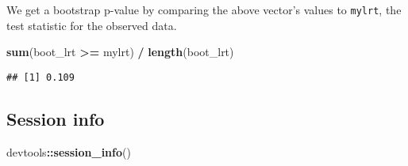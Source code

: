 \documentclass[oneside]{book}
\newenvironment{Shaded}{\begin{snugshade}}{\end{snugshade}}
\newcommand{\KeywordTok}[1]{\textcolor[rgb]{0.13,0.29,0.53}{\textbf{#1}}}
\newcommand{\NormalTok}[1]{#1}
\newcommand{\OperatorTok}[1]{\textcolor[rgb]{0.81,0.36,0.00}{\textbf{#1}}}
\newcommand{\StringTok}[1]{\textcolor[rgb]{0.31,0.60,0.02}{#1}}
\begin{document}
We get a bootstrap p-value by comparing the above vector's values to
\texttt{mylrt}, the test statistic for the observed data.

\begin{Shaded}
\begin{Highlighting}[]
\KeywordTok{sum}\NormalTok{(boot_lrt }\OperatorTok{>=}\StringTok{ }\NormalTok{mylrt) }\OperatorTok{/}\StringTok{ }\KeywordTok{length}\NormalTok{(boot_lrt)}
\end{Highlighting}
\end{Shaded}

\begin{verbatim}
## [1] 0.109
\end{verbatim}

\hypertarget{session-info}{%
\subsection{Session info}\label{session-info}}

\begin{Shaded}
\begin{Highlighting}[]
\NormalTok{devtools}\OperatorTok{::}\KeywordTok{session_info}\NormalTok{()}
\end{Highlighting}
\end{Shaded}
\end{document}
